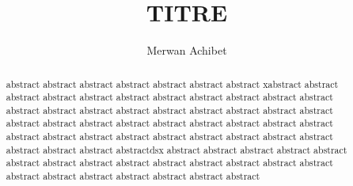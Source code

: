 \documentclass[10pt]{article}
\title{TITRE}
\author{Merwan Achibet}
\date{}
\begin{document}
\maketitle

\begin{abstract}
abstract abstract abstract abstract abstract abstract abstract
xabstract abstract abstract abstract abstract abstract abstract
abstract abstract abstract abstract abstract abstract abstract
abstract abstract abstract abstract abstract abstract abstract
abstract abstract abstract abstract abstract abstract abstract
abstract abstract abstract abstract abstract abstract abstract
abstract abstract abstract abstract abstract abstract abstractdsx
abstract abstract abstract abstract abstract abstract abstract
abstract abstract abstract abstract abstract abstract abstract
abstract abstract abstract abstract abstract abstract abstract
\end{abstract}
\end{document}
